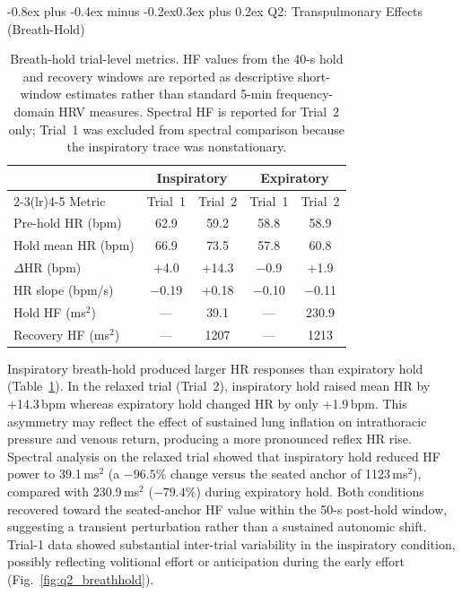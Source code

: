 \documentclass[11pt,a4paper]{article}
\makeatletter
\renewcommand\subsection{\@startsection{subsection}{2}{\z@}%
  {-0.8ex plus -0.4ex minus -0.2ex}{0.3ex plus 0.2ex}%
  {\normalfont\normalsize\bfseries}}
\makeatother
\begin{document}
\subsection{Q2: Transpulmonary Effects (Breath-Hold)}

\begin{table}[H]
\centering
\caption{Breath-hold trial-level metrics. HF values from the 40-s hold
and recovery windows are reported as descriptive short-window estimates
rather than standard 5-min frequency-domain HRV measures. Spectral HF is
reported for Trial~2 only; Trial~1 was excluded from spectral comparison
because the inspiratory trace was nonstationary.}
\label{tab:q2}
\small
\begin{tabular}{@{}lcccc@{}}
\toprule
 & \multicolumn{2}{c}{Inspiratory} & \multicolumn{2}{c}{Expiratory} \\
\cmidrule(lr){2-3}\cmidrule(lr){4-5}
Metric & Trial~1 & Trial~2 & Trial~1 & Trial~2 \\
\midrule
Pre-hold HR (bpm)      & 62.9   & 59.2 & 58.8 & 58.9 \\
Hold mean HR (bpm)     & 66.9   & 73.5 & 57.8 & 60.8 \\
$\Delta$HR (bpm)       & +4.0   & +14.3 & $-$0.9 & +1.9 \\
HR slope (bpm/s)       & $-$0.19 & +0.18 & $-$0.10 & $-$0.11 \\
Hold HF (ms$^{2}$)     & ---    & 39.1 & ---  & 230.9 \\
Recovery HF (ms$^{2}$) & ---    & 1207 & ---  & 1213 \\
\bottomrule
\end{tabular}
\end{table}

Inspiratory breath-hold produced larger HR responses than expiratory
hold (Table~\ref{tab:q2}). In the relaxed trial (Trial~2), inspiratory
hold raised mean HR by +14.3\,bpm whereas expiratory hold changed HR by
only +1.9\,bpm. This asymmetry may reflect the effect of sustained lung
inflation on intrathoracic pressure and venous return, producing a more
pronounced reflex HR rise. Spectral analysis on the relaxed trial showed
that inspiratory hold reduced HF power to 39.1\,ms$^{2}$ (a $-96.5\%$
change versus the seated anchor of 1123\,ms$^{2}$), compared with
230.9\,ms$^{2}$ ($-79.4\%$) during expiratory hold. Both conditions
recovered toward the seated-anchor HF value within the 50-s post-hold
window, suggesting a transient perturbation rather than a sustained
autonomic shift. Trial-1 data showed substantial inter-trial variability
in the inspiratory condition, possibly reflecting volitional effort or
anticipation during the early effort (Fig.~\ref{fig:q2_breathhold}).
\end{document}
